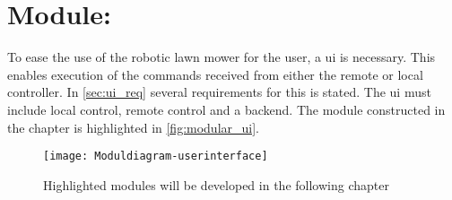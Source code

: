 \graphicspath{{figures/design/userinterface/}}
\chapter{Module: }\label{ch:userinterface}
To ease the use of the robotic lawn mower for the user, a \gls{ui} is necessary. This enables execution of the commands received from either the remote or local controller. In \autoref{sec:ui_req} several requirements for this is stated. The \gls{ui} must include local control, remote control and a backend. The module constructed in the chapter is highlighted in \autoref{fig:modular_ui}.   

\begin{figure}[h]%
\centering%
\texttt{[image: Moduldiagram-userinterface]}%
\caption{Highlighted modules will be developed in the following chapter}%
\label{fig:modular_ui}%
\end{figure}


